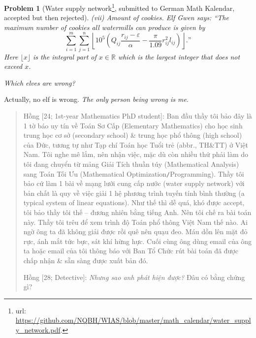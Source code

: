 \documentclass[12pt,oneside]{book}
\newtheorem{problem}{Problem}
\begin{document}
\begin{problem}[Water supply network\footnote{{\sc url}: \url{https://github.com/NQBH/WIAS/blob/master/math_calendar/water_supply_network.pdf}.}, submitted to German {\sc Math Kalendar}, accepted but then rejected]
	\item(vii) {\sf Amount of cookies.} Elf Gwen says: ``The maximum number of cookies all watermills can produce is given by
	\begin{equation*}
		\sum_{i = 1}^m\sum_{j = 1}^n \left\lfloor10^5\left(Q_{ij}\frac{r_{ij} - \varepsilon}{\alpha} - \frac{\pi}{1.09}r_{ij}^2l_{ij}\right)\right\rfloor.\mbox{''}
	\end{equation*}
	Here $\lfloor x\rfloor$ is the \emph{integral part} of $x\in\mathbb{R}$ which is the largest integer that does not exceed $x$.
	
	Which elves are wrong?
\end{problem}
Actually, no elf is wrong. {\it The only person being wrong is me}.

\begin{quote}
	{\sf Hồng [24; 1st-year Mathematics PhD student]}: Ban đầu thầy tôi bảo đây là 1 tờ báo uy tín về Toán Sơ Cấp (Elementary Mathematics) cho học sinh trung học cơ sở (secondary school) \& trung học phổ thông (high school) của Đức, tương tự như Tạp chí Toán học Tuổi trẻ (abbr., TH\&TT) ở Việt Nam. Tôi nghe mê lắm, nên nhận việc, mặc dù còn nhiều thứ phải làm do tôi đang chuyển từ mảng Giải Tích thuần túy (Mathematical Analysis) sang Toán Tối Ưu (Mathematical Optimization{\tt/}Programming). Thầy tôi bảo cứ làm 1 bài về mạng lưới cung cấp nước (water supply network) với bản chất là quy về việc giải 1 hệ phương trình tuyến tính bình thường (a typical system of linear equations). Như thế thì dễ quá, khó được accept, tôi bảo thầy tôi thế -- đương nhiên bằng tiếng Anh. Nên tôi chế ra bài toán này. Thầy tôi trêu để xem trình độ Toán phổ thông Việt Nam thế nào. Ai ngờ ông ta đã không giải được rồi quê nên quạu đeo. Máu dồn lên mặt đỏ rực, ánh mắt tức bực, sát khí hừng hực. Cuối cùng ông dùng email của ông ta hoặc email của tôi thông báo với Ban Tổ Chức rút bài toán đã được chấp nhận \& sẵn sàng được xuất bản đó.
	
	{\sf Hồng [28; Detective]}: {\it Nhưng sao anh phát hiện được?} Đâu có bằng chứng gì?
	

\end{quote}
\end{document}
